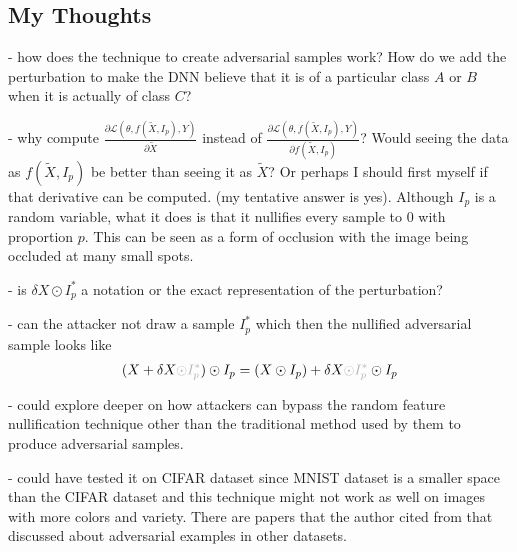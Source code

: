 \documentclass[a4paper,10pt]{article}
\theoremstyle{definition}
\begin{document}
\subsection*{My Thoughts}
- how does the technique to create adversarial samples work? How do we add the perturbation to make the DNN believe that it is of a particular class $A$ or $B$ when it is actually of class $C$?


- why compute  $\frac{\partial \mathcal{L}(\theta, f(\tilde{X},I_p),Y)}{\partial \tilde{X}}$ instead of  $\frac{\partial \mathcal{L}(\theta, f(\tilde{X},I_p),Y)}{\partial  f(\tilde{X},I_p)}$? Would seeing the data as $f(\tilde{X},I_p)$  be better than seeing it as $\tilde{X}$? Or perhaps I should first myself if that derivative can be computed. (my tentative answer is yes). Although $I_p$ is a random variable, what it does is that it nullifies every sample to 0 with proportion $p$. This can be seen as a form of occlusion with the image being occluded at many small spots.

- is $\delta X \odot I_p^\ast$ a notation or the exact representation of the perturbation?

- can the attacker not draw a sample $I_p^\ast$ which then the nullified adversarial sample looks like
\begin{align*}
(X+\delta X {\color{black!30}\odot I_p^\ast}) \odot I_p = (X \odot I_p) + \delta X {\color{black!30}\odot I_p^\ast} \odot I_p
\end{align*}


- could explore deeper on how attackers can bypass the random feature nullification technique other than the traditional method used by them to produce adversarial samples.

- could have tested it on CIFAR dataset since MNIST dataset is a smaller space than the CIFAR dataset and this technique might not work as well on images with more colors and variety. There are papers that the author cited from that discussed about adversarial examples in other datasets.
\end{document}
